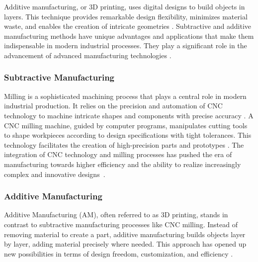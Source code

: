\documentclass[ZLstudentexpose%
              ,optBiber%
              ,optEnglish%
              ,10pt
              ]{ZLlatex}%
\begin{document}
Additive manufacturing, or 3D printing, uses digital designs to build objects in layers. This technique provides remarkable design flexibility, minimizes material waste, and enables the creation of intricate geometries \cite{Dilberoglu.2017}. Subtractive and additive manufacturing methods have unique advantages and applications that make them indispensable in modern industrial processes. They play a significant role in the advancement of advanced manufacturing technologies \cite{Bandyopadhyay.2020, vanLe.2017}.



\subsubsection{Subtractive Manufacturing}
Milling is a sophisticated machining process that plays a central role in modern industrial production. It relies on the precision and automation of CNC technology to machine intricate shapes and components with precise accuracy \cite{Jayawardane.2023}. A CNC milling machine, guided by computer programs, manipulates cutting tools to shape workpieces according to design specifications with tight tolerances. This technology facilitates the creation of high-precision parts and prototypes \cite{Amanullah.2017}. The integration of CNC technology and milling processes has pushed the era of manufacturing towards higher efficiency and the ability to realize increasingly complex and innovative designs~\cite{Wang.2023}.
\newpage
\subsubsection{Additive Manufacturing}
Additive Manufacturing (AM), often referred to as 3D printing, stands in contrast to subtractive manufacturing processes like CNC milling. Instead of removing material to create a part, additive manufacturing builds objects layer by layer, adding material precisely where needed. This approach has opened up new possibilities in terms of design freedom, customization, and efficiency \cite{Prakash.2018}.
\end{document}
